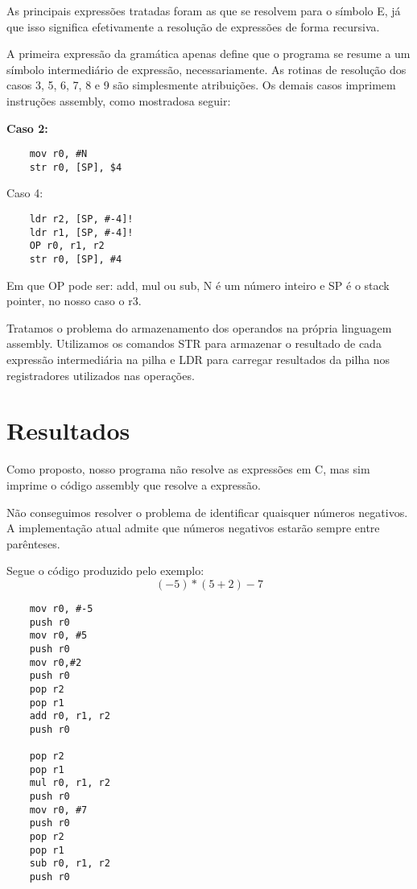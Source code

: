 \documentclass[a4paper, 11pt]{article}
\begin{document}
\begin{multicols*}{2}
\begin{multicols*}{2}
\end{multicols*}

As principais expressões tratadas foram as que se resolvem para o símbolo E, já que isso significa efetivamente a resolução de expressões de forma recursiva.

A primeira expressão da gramática apenas define que o programa se resume a um símbolo intermediário de expressão, necessariamente. As rotinas de resolução dos casos 3, 5, 6, 7, 8 e 9 são simplesmente atribuições. Os demais casos imprimem instruções assembly, como mostradosa seguir:

\begin{multicols*}{2}
\bf Caso 2:
\begin{verbatim}
    mov r0, #N
    str r0, [SP], $4
\end{verbatim}

\break
\vfill

Caso 4:
\begin{verbatim}
    ldr r2, [SP, #-4]!
    ldr r1, [SP, #-4]!
    OP r0, r1, r2
    str r0, [SP], #4
\end{verbatim}

\end{multicols*}

Em que OP pode ser: add, mul ou sub, N é um número inteiro e SP é o stack pointer, no nosso caso o r3.

Tratamos o problema do armazenamento dos operandos na própria linguagem assembly. Utilizamos os comandos STR para armazenar o resultado de cada expressão intermediária na pilha e LDR para carregar resultados da pilha nos registradores utilizados nas operações.

\section*{Resultados}

Como proposto, nosso programa não resolve as expressões em C, mas sim imprime o código assembly que resolve a expressão.

Não conseguimos resolver o problema de identificar quaisquer números negativos. A implementação atual admite que números negativos estarão sempre entre parênteses.

Segue o código produzido pelo exemplo: $$(-5)*(5 + 2) - 7$$

\begin{multicols*}{2}

\begin{verbatim}
    mov r0, #-5
    push r0
    mov r0, #5
    push r0
    mov r0,#2
    push r0
    pop r2
    pop r1
    add r0, r1, r2
    push r0

    pop r2
    pop r1
    mul r0, r1, r2
    push r0
    mov r0, #7
    push r0
    pop r2
    pop r1
    sub r0, r1, r2
    push r0
\end{verbatim}

\end{multicols*}

\end{multicols*}
\end{document}
